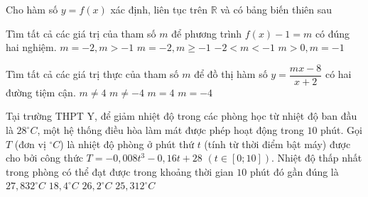 \begin{ex}%
	Cho hàm số $y=f(x)$ xác định, liên tục trên $\mathbb{R}$ và có bảng biến thiên sau
	\begin{center}
	\end{center}
	Tìm tất cả các giá trị của tham số $m$ để phương trình $f(x)-1=m$ có đúng hai nghiệm.
	\choice
	{\True $m=-2,m>-1$}
	{$m=-2,m\ge -1$}
	{$-2<m<-1$}
	{$m>0,m=-1$}
	\loigiai{
	$f( x )-1=m\Leftrightarrow f( x )=m+1$. \\
	Dựa vào bảng biến thiên, để phương trình $f\left( x \right)-1=m$ có đúng hai nghiệm thì\\
	$\left[ \begin{aligned}
			 & m+1>0  \\
			 & m+1=-1 \\
		\end{aligned} \right.\Leftrightarrow \left[ \begin{aligned}
			 & m>-1  \\
			 & m=-2.
		\end{aligned} \right.$}
\end{ex}

\begin{ex}%
	Tìm tất cả các giá trị thực của tham số $m$ để đồ thị hàm số $y=\dfrac{mx-8}{x+2}$ có hai đường tiệm cận.
	\choice
	{$m\neq 4$}
	{\True $m\neq -4$}
	{$m=4$}
	{$m=-4$}
\end{ex}

\begin{ex}%
	Tại trường THPT Y, để giảm nhiệt độ trong các phòng học từ nhiệt độ ban đầu là $28^\circ C$, một hệ thống điều hòa làm mát được phép hoạt động trong $10$ phút. Gọi $T$ (đơn vị $^\circ C$) là nhiệt độ phòng ở phút thứ $t$ (tính từ thời điểm bật máy) được cho bởi công thức $T=-0{,}008t^3-0{,}16t+28$ $\left(t \in \left[0;10\right]\right)$. Nhiệt độ thấp nhất trong phòng có thể đạt được trong khoảng thời gian $10$ phút đó gần đúng là
	\choice
	{$27{,}832^\circ C$}
	{\True $18{,}4^\circ C$}
	{$26{,}2^\circ C$}
	{$25{,}312^\circ C$}
\end{ex}

